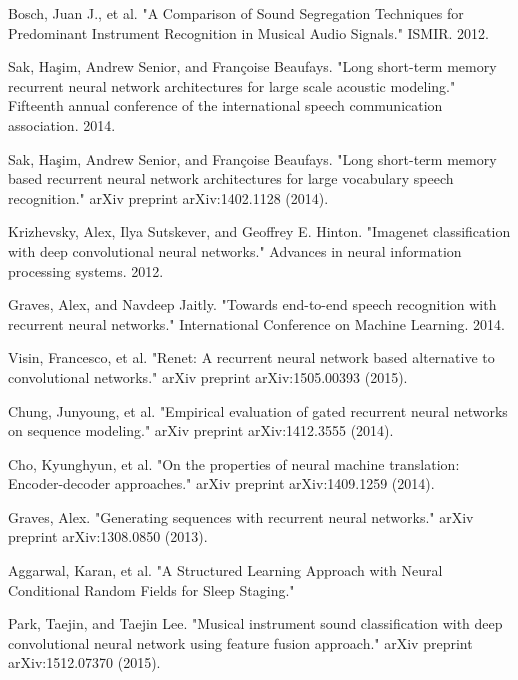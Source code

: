 \documentclass[letterpaper, 12 pt, conference]{ieeeconf}  %
\begin{document}
\begin{thebibliography}{99}

 Bosch, Juan J., et al. "A Comparison of Sound Segregation Techniques for Predominant Instrument Recognition in Musical Audio Signals." ISMIR. 2012.

 Sak, Haşim, Andrew Senior, and Françoise Beaufays. "Long short-term memory recurrent neural network architectures for large scale acoustic modeling." Fifteenth annual conference of the international speech communication association. 2014.

 Sak, Haşim, Andrew Senior, and Françoise Beaufays. "Long short-term memory based recurrent neural network architectures for large vocabulary speech recognition." arXiv preprint arXiv:1402.1128 (2014).

 Krizhevsky, Alex, Ilya Sutskever, and Geoffrey E. Hinton. "Imagenet classification with deep convolutional neural networks." Advances in neural information processing systems. 2012.

 Graves, Alex, and Navdeep Jaitly. "Towards end-to-end speech recognition with recurrent neural networks." International Conference on Machine Learning. 2014.

 Visin, Francesco, et al. "Renet: A recurrent neural network based alternative to convolutional networks." arXiv preprint arXiv:1505.00393 (2015).

 Chung, Junyoung, et al. "Empirical evaluation of gated recurrent neural networks on sequence modeling." arXiv preprint arXiv:1412.3555 (2014).

 Cho, Kyunghyun, et al. "On the properties of neural machine translation: Encoder-decoder approaches." arXiv preprint arXiv:1409.1259 (2014).

 Graves, Alex. "Generating sequences with recurrent neural networks." arXiv preprint arXiv:1308.0850 (2013).

 Aggarwal, Karan, et al. "A Structured Learning Approach with Neural Conditional Random Fields for Sleep Staging."

 Park, Taejin, and Taejin Lee. "Musical instrument sound classification with deep convolutional neural network using feature fusion approach." arXiv preprint arXiv:1512.07370 (2015).


\end{thebibliography}
\end{document}
